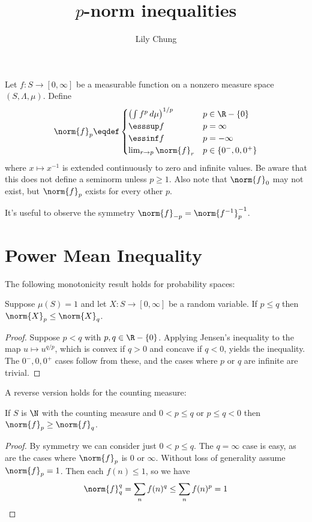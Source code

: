 \documentclass{article}
\title{$p$-norm inequalities}
\author{Lily Chung}
\date{}
\begin{document}
\maketitle

Let $f : S \to [0, \infty]$ be a measurable function on a nonzero measure space $(S, \Lambda, \mu)$.
Define \[\norm{f}_p \eqdef \begin{cases}
  \left(\int f^p\,d\mu\right)^{1/p} & p \in \R - \{0\} \\
  \esssup f & p = \infty \\
  \essinf f & p = -\infty \\
  \lim_{r \to p} \norm{f}_r & p \in \{0^-, 0, 0^+\} \\
  \end{cases}
\]
where $x \mapsto x^{-1}$ is extended continuously to zero and infinite values.
Be aware that this does not define a seminorm unless $p \ge 1$.
Also note that $\norm{f}_0$ may not exist, but $\norm{f}_p$ exists for every other $p$.

It's useful to observe the symmetry $\norm{f}_{-p} = \norm{f^{-1}}_p^{-1}$.

\section*{Power Mean Inequality}

The following monotonicity result holds for probability spaces:

\begin{theorem}\label{thm:power mean}
  Suppose $\mu(S) = 1$ and let $X : S \to [0, \infty]$ be a random variable.
  If $p \le q$ then $\norm{X}_p \le \norm{X}_q$.
\end{theorem}
\begin{proof}
  Suppose $p < q$ with $p, q \in \R - \{0\}$.
  Applying Jensen's inequality to the map $u \mapsto u^{q/p}$,
  which is convex if $q > 0$ and concave if $q < 0$,
  yields the inequality.
  The $0^-, 0, 0^+$ cases follow from these,
  and the cases where $p$ or $q$ are infinite are trivial.
\end{proof}

A reverse version holds for the counting measure:

\begin{theorem}\label{thm:counting}
  If $S$ is $\N$ with the counting measure and $0 < p \le q$ or $p \le q < 0$ then $\norm{f}_p \ge \norm{f}_q$.
\end{theorem}
\begin{proof}
  By symmetry we can consider just $0 < p \le q$.  The $q = \infty$ case is easy, as are the cases where $\norm{f}_p$ is 0 or $\infty$.
  Without loss of generality assume $\norm{f}_p = 1$.
  Then each $f(n) \le 1$, so we have
  \[
  \norm{f}_q^q = \sum_n f(n)^q \le \sum_n f(n)^p = 1
  \]
\end{proof}
\end{document}
